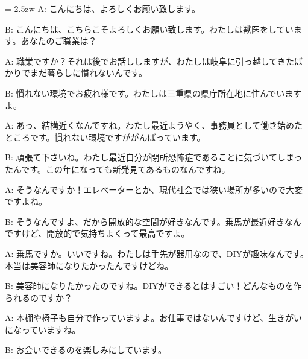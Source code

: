 \documentclass[11pt]{amsart}
\title{}
\author{}
\newenvironment{hangall}[1]{\hangindent = 2.5zw\everypar{\hangindent = 2.5zw}}{}
\begin{document}
\maketitle
\begin{hangall}{}%
A: こんにちは、よろしくお願い致します。

B: こんにちは、こちらこそよろしくお願い致します。わたしは獣医をしています。あなたのご職業は？

A: 職業ですか？それは後でお話ししますが、わたしは岐阜に引っ越してきたばかりでまだ暮らしに慣れないんです。

B: 慣れない環境でお疲れ様です。わたしは三重県の県庁所在地に住んでいますよ。

A: あっ、結構近くなんですね。わたし最近ようやく、事務員として働き始めたところです。慣れない環境ですががんばっています。

B: 頑張て下さいね。わたし最近自分が閉所恐怖症であることに気づいてしまったんです。この年になっても新発見てあるものなんですね。

A: そうなんですか！エレベーターとか、現代社会では狭い場所が多いので大変ですよね。

B: そうなんですよ、だから開放的な空間が好きなんです。乗馬が最近好きなんですけど、開放的で気持ちよくって最高ですよ。

A: 乗馬ですか。いいですね。わたしは手先が器用なので、DIYが趣味なんです。本当は美容師になりたかったんですけどね。

B: 美容師になりたかったのですね。DIYができるとはすごい！どんなものを作られるのですか？

A: 本棚や椅子も自分で作っていますよ。お仕事ではないんですけど、生きがいになっていますね。

B: \ul{お会いできるのを楽しみにしています。}\end{hangall}
\end{document}
